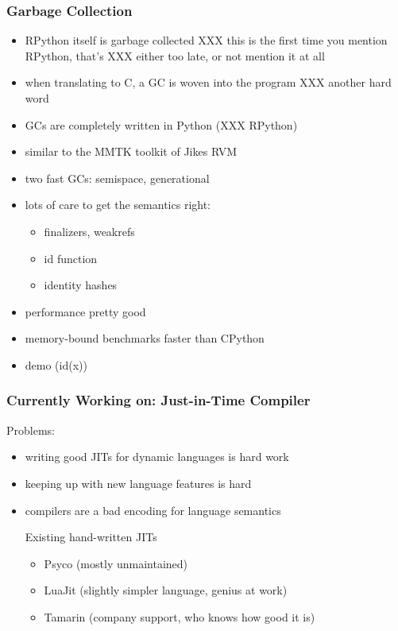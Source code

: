 \documentclass[utf8x]{beamer}
\begin{document}
\begin{frame}
  \frametitle{Garbage Collection}
  \begin{itemize}
  \item RPython itself is garbage collected
        XXX this is the first time you mention RPython, that's
        XXX either too late, or not mention it at all
  \item when translating to C, a GC is woven into the program
        XXX another hard word
  \item GCs are completely written in Python (XXX RPython)
  \item similar to the MMTK toolkit of Jikes RVM
  \item two fast GCs: semispace, generational
  \item lots of care to get the semantics right:
    \begin{itemize}
    \item finalizers, weakrefs
    \item id function
    \item identity hashes
    \end{itemize}
  \item performance pretty good
  \item memory-bound benchmarks faster than CPython
  \item demo (id(x))
  \end{itemize}
\end{frame}


\begin{frame}
  \frametitle{Currently Working on: Just-in-Time Compiler}
  Problems:
  \begin{itemize}
  \item writing good JITs for dynamic languages is hard work
  \item keeping up with new language features is hard
  \item compilers are a bad encoding for language semantics
  \pause
  \begin{block}{
    Existing hand-written JITs}
    \begin{itemize}
    \item Psyco (mostly unmaintained)
    \item LuaJit (slightly simpler language, genius at work)
    \item Tamarin (company support, who knows how good it is)
    \end{itemize}
  \end{block}
  \end{itemize}
  \pause
\end{frame}
\end{document}
